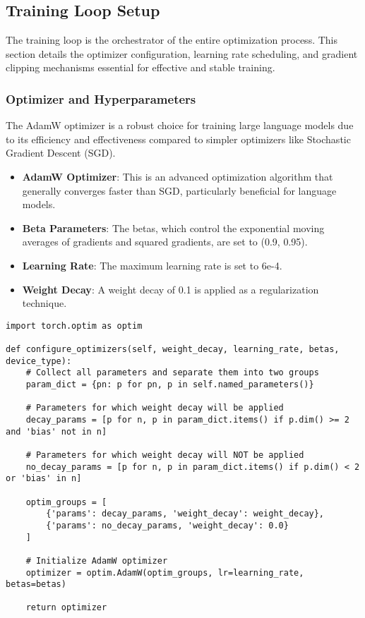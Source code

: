 \subsection{Training Loop Setup}
The training loop is the orchestrator of the entire optimization process. This section details the optimizer configuration, learning rate scheduling, and gradient clipping mechanisms essential for effective and stable training.

\subsubsection{Optimizer and Hyperparameters}
The AdamW optimizer is a robust choice for training large language models due to its efficiency and effectiveness compared to simpler optimizers like Stochastic Gradient Descent (SGD).

\begin{itemize}
    \item \textbf{AdamW Optimizer}: This is an advanced optimization algorithm that generally converges faster than SGD, particularly beneficial for language models.
    \item \textbf{Beta Parameters}: The betas, which control the exponential moving averages of gradients and squared gradients, are set to (0.9, 0.95).
    \item \textbf{Learning Rate}: The maximum learning rate is set to 6e-4.
    \item \textbf{Weight Decay}: A weight decay of 0.1 is applied as a regularization technique.
\end{itemize}

\begin{lstlisting}[caption={Optimizer Configuration}]
import torch.optim as optim

def configure_optimizers(self, weight_decay, learning_rate, betas, device_type):
    # Collect all parameters and separate them into two groups
    param_dict = {pn: p for pn, p in self.named_parameters()}
    
    # Parameters for which weight decay will be applied
    decay_params = [p for n, p in param_dict.items() if p.dim() >= 2 and 'bias' not in n]
    
    # Parameters for which weight decay will NOT be applied
    no_decay_params = [p for n, p in param_dict.items() if p.dim() < 2 or 'bias' in n]
    
    optim_groups = [
        {'params': decay_params, 'weight_decay': weight_decay},
        {'params': no_decay_params, 'weight_decay': 0.0}
    ]
    
    # Initialize AdamW optimizer
    optimizer = optim.AdamW(optim_groups, lr=learning_rate, betas=betas)
    
    return optimizer
\end{lstlisting}

